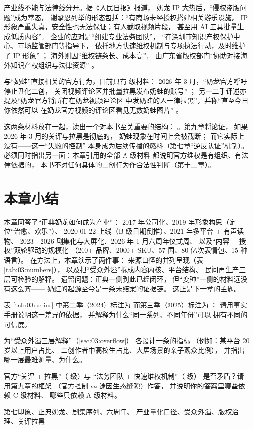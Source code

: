 产业线不能与法律线分开。据《人民日报》报道，
奶龙 IP 大热后，“侵权盗版问题”成为常态，
谢承恩列举的形态包括：“有商场未经授权搭建相关游乐设施，
IP 形象严重失真，安全性也无法保证；有人截取视频片段，
甚至用 AI 工具批量生成低质内容”\cite{jiang2026nailong}。
企业的应对是“组建专业法务团队”，
“在深圳市知识产权保护中心、市场监管部门等指导下，
依托地方快速维权机制与专项执法行动，及时维护了 IP 形象”
\cite{jiang2026nailong}；
海外则因“维权链条长、成本高”，
由广东省版权部门“协助对接海外知识产权组织与法律资源”
\cite{jiang2026nailong}。

与“奶蛙”直接相关的官方行为，目前只有  级材料：
2026 年 3 月，“奶龙官方呼吁停止丑化二创，
关闭视频评论区并批量拉黑发布奶蛙的账号”
\cite{shoutanji2026naiwa}；
另一二手评述亦提及“奶龙官方将所有在奶龙视频评论区
中发奶蛙的人一律拉黑”，并称“直至今日你依然可以
在奶龙官方视频的评论区看见无数奶蛙图片”
\cite{shoutanji2026naiwa}。

这两条材料放在一起，读出一个对本书至关重要的结构：
。第九章将论证，
如果 2026 年 3 月的关评与拉黑是彻底的，
奶蛙现象在时间上会被截断；
而它实际上没有——这一“失败的控制”
本身成为后续传播的燃料（第七章“逆反认证”机制）。
必须同时指出另一面：本章引用的全部 A 级材料
都说明官方维权是有组织、有法律依据的，
本书不对任何具体的二创行为作合法性判断（第十二章）。

\section{本章小结}\label{sec:03:summary}

本章回答了“正典奶龙如何成为产业”：
2017 年公司化、2019 年形象构思（定位“治愈、欢乐”）、
2020-01-22 上线（B 级日期倒推）、2021 年多平台 + 有声读物、
2023—2026 剧集化与大屏化、2026 年 1 月六周年仪式周、
以及“内容 + 授权”双轮驱动的规模化
（200+ 品牌、2000+ SKU、57 国、80 亿次表情包、15 种语言）。
在方法上，本章演示了两件事：
来源口径的并列呈现（表 \ref{tab:03:numbers}），
以及把“受众外溢”拆成内容内核、平台结构、
民间再生产三层可检验的解释。
遗留问题：正典一侧到此已经闭环，
但“变种”一侧的材料远没有这么齐——
奶蛙的起源至今是一条未结案的证据链。
这正是下一章的主题。

\begin{nlexercises}
  \item 表 \ref{tab:03:series} 中第二季（2024）标注为 
        而第三季（2025）标注为 ：
        请用事实手册说明这一差异的依据，
        并解释为什么“同一系列、不同年份”可以
        拥有不同的可信度。
  \item 为“受众外溢三层解释”（\ref{sec:03:overflow}）
        各设计一条的指标
        （例如：某平台 20 岁以上用户占比、
        二创作者中高校生占比、大屏场景的亲子观众比例），
        并指出哪一层最难测量、为什么。
  \item 官方“关评 + 拉黑”（ 级）与
        “法务团队 + 快速维权机制”（ 级）
        是否矛盾？请用第九章的框架
        （官方控制 vs 迷因生态缝隙）作答，
        并说明你的答案里哪些依赖 C 级材料、
        哪些只依赖 A 级材料。
\end{nlexercises}

\nlkeywords 第七印象、正典奶龙、剧集序列、六周年、
产业量化口径、受众外溢、版权治理、关评拉黑
